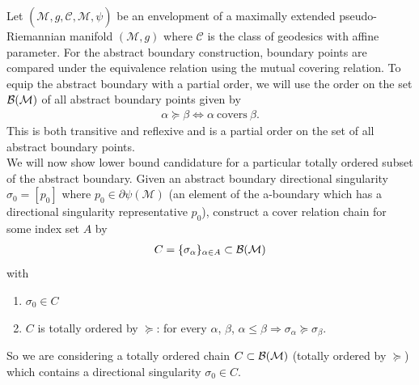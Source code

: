 \documentclass[pdflatex,sn-mathphys-num]{sn-jnl}
\newtheorem{prop}[theorem]{Proposition}
\theoremstyle{definition}
\begin{document}
Let $(\mathcal{M},g,\mathcal{C},\hat{\mathcal{M}},\psi)$ be an envelopment of a maximally extended pseudo-Riemannian manifold $(\mathcal{M},g)$ where $\mathcal{C}$ is the class of geodesics with affine parameter.  For the abstract boundary construction, boundary points are compared under the equivalence relation using the mutual covering relation. To equip the abstract boundary with a partial order, we will use the order on the set ${\cal B}(\cal M)$ of all abstract boundary points given by 
\begin{align*}
    \alpha \succeq \beta \Leftrightarrow \alpha~\text{covers}~\beta .
\end{align*}
This is both transitive and reflexive and is a partial order on the set of all abstract boundary points.\\

We will now show lower bound candidature for a particular totally ordered subset of the abstract boundary. Given an abstract boundary directional singularity $\sigma_0 = [p_0]$ where $p_0 \in \partial\psi(\mathcal{M})$ (an element of the a-boundary which has a directional singularity representative $p_0$), construct a cover relation chain for some index set $A$ by
\begin{align*}
    C = \{\sigma_{\alpha}\}_{\alpha \in A} \subset {\cal B}(\cal M)
\end{align*}
with
\begin{enumerate}
    \item $\sigma_0 \in C$
    \item $C$ is totally ordered by $\succeq$: for every $\alpha$, $\beta$, $\alpha \leq \beta \Rightarrow \sigma_{\alpha} \succeq \sigma_{\beta}$.
\end{enumerate}
So we are considering a totally ordered chain $C \subset {\cal B}(\cal M)$ (totally ordered by $\succeq$) which contains a directional singularity $\sigma_0 \in C$.\\
\end{document}
